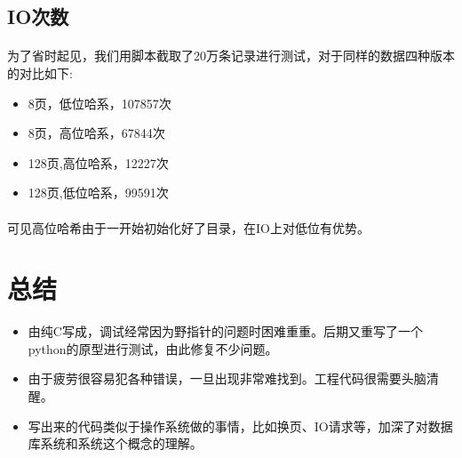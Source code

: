 \documentclass{article}
\begin{document}
    \subsection{IO次数}
        \paragraph{}
            为了省时起见，我们用脚本截取了20万条记录进行测试，对于同样的数据四种版本的对比如下:
        \begin{itemize}
            \item 8页，低位哈系，107857次
            \item 8页，高位哈系，67844次
            \item 128页,高位哈系，12227次
            \item 128页,低位哈系，99591次
        \end{itemize}
        \paragraph{}
            可见高位哈希由于一开始初始化好了目录，在IO上对低位有优势。
\section{总结}
    \begin{itemize}
        \item 由纯C写成，调试经常因为野指针的问题时困难重重。后期又重写了一个python的原型进行测试，由此修复不少问题。
        \item 由于疲劳很容易犯各种错误，一旦出现非常难找到。工程代码很需要头脑清醒。
        \item 写出来的代码类似于操作系统做的事情，比如换页、IO请求等，加深了对数据库系统和系统这个概念的理解。
    \end{itemize}
\end{document}
